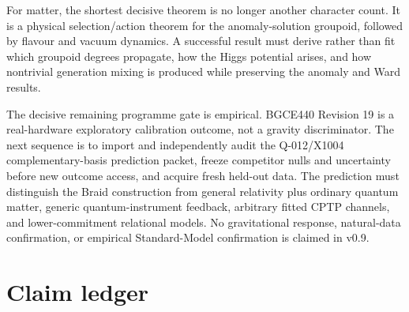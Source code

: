 \documentclass[11pt]{article}
\theoremstyle{definition}
\theoremstyle{remark}
\begin{document}
For matter, the shortest decisive theorem is no longer another character count. It is a physical selection/action theorem for the anomaly-solution groupoid, followed by flavour and vacuum dynamics. A successful result must derive rather than fit which groupoid degrees propagate, how the Higgs potential arises, and how nontrivial generation mixing is produced while preserving the anomaly and Ward results.

The decisive remaining programme gate is empirical. BGCE440 Revision 19 is a real-hardware exploratory calibration outcome, not a gravity discriminator. The next sequence is to import and independently audit the Q-012/X1004 complementary-basis prediction packet, freeze competitor nulls and uncertainty before new outcome access, and acquire fresh held-out data. The prediction must distinguish the Braid construction from general relativity plus ordinary quantum matter, generic quantum-instrument feedback, arbitrary fitted CPTP channels, and lower-commitment relational models. No gravitational response, natural-data confirmation, or empirical Standard-Model confirmation is claimed in v0.9.

\section{Claim ledger}
\end{document}
